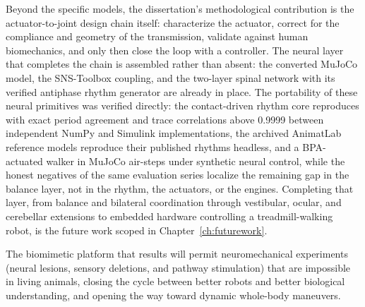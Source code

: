 Beyond the specific models, the dissertation's methodological contribution is the actuator-to-joint design chain itself: characterize the actuator, correct for the compliance and geometry of the transmission, validate against human biomechanics, and only then close the loop with a controller. The neural layer that completes the chain is assembled rather than absent: the converted MuJoCo model, the SNS-Toolbox coupling, and the two-layer spinal network with its verified antiphase rhythm generator are already in place. The portability of these neural primitives was verified directly: the contact-driven rhythm core reproduces with exact period agreement and trace correlations above 0.9999 between independent NumPy and Simulink implementations, the archived AnimatLab reference models reproduce their published rhythms headless, and a BPA-actuated walker in MuJoCo air-steps under synthetic neural control, while the honest negatives of the same evaluation series localize the remaining gap in the balance layer, not in the rhythm, the actuators, or the engines. Completing that layer, from balance and bilateral coordination through vestibular, ocular, and cerebellar extensions to embedded hardware controlling a treadmill-walking robot, is the future work scoped in Chapter~\ref{ch:futurework}.

The biomimetic platform that results will permit neuromechanical experiments (neural lesions, sensory deletions, and pathway stimulation) that are impossible in living animals, closing the cycle between better robots and better biological understanding, and opening the way toward dynamic whole-body maneuvers.


